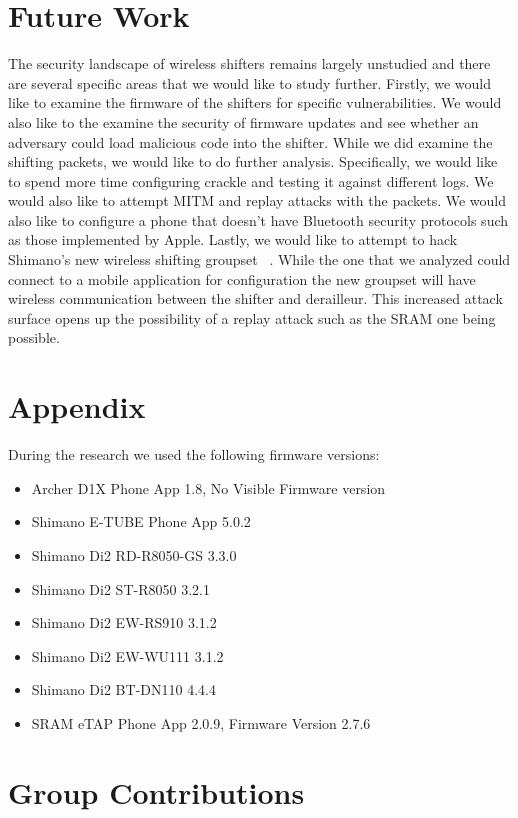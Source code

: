 \documentclass[letterpaper,twocolumn,10pt]{article}
\begin{document}
\section{Future Work}

The security landscape of wireless shifters remains largely unstudied and there are several specific areas that we would like to study further. Firstly, we would like to examine the firmware of the shifters for specific vulnerabilities. We would also like to the examine the security of firmware updates and see whether an adversary could load malicious code into the shifter. While we did examine the shifting packets, we would like to do further analysis. Specifically, we would like to spend more time configuring crackle and testing it against different logs. We would also like to attempt MITM and replay attacks with the packets. We would also like to configure a phone that doesn’t have Bluetooth security protocols such as those implemented by Apple. Lastly, we would like to attempt to hack Shimano’s new wireless shifting groupset~ \cite{newshimano}. While the one that we analyzed could connect to a mobile application for configuration the new groupset will have wireless communication between the shifter and derailleur. This increased attack surface opens up the possibility of a replay attack such as the SRAM one being possible.

  {\normalsize 
    }


\section{Appendix}
During the research we used the following firmware versions:
\begin{itemize}
  \item Archer D1X Phone App 1.8, No Visible Firmware version
  \item Shimano E-TUBE Phone App 5.0.2
  \item Shimano Di2 RD-R8050-GS 3.3.0
  \item Shimano Di2 ST-R8050 3.2.1
  \item Shimano Di2 EW-RS910 3.1.2
  \item Shimano Di2 EW-WU111 3.1.2
  \item Shimano Di2 BT-DN110 4.4.4
  \item SRAM eTAP Phone App 2.0.9, Firmware Version 2.7.6
\end{itemize}
\section{Group Contributions}
\end{document}
